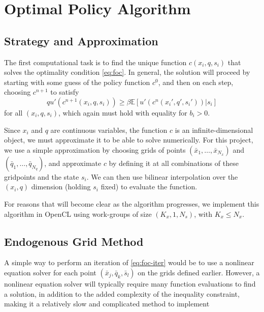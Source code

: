 \documentclass[a4paper,12pt]{article}
\newcommand{\E}{\mathbb{E}}
\numberwithin{equation}{section}
\theoremstyle{definition}
\begin{document}
\section{Optimal Policy Algorithm}
\label{sec:optim-policy-algor}

\subsection{Strategy and Approximation}

The first computational task is to find the unique function $c(x_i, q,
s_i)$ that solves the optimality condition \eqref{eq:foc}. In general,
the solution will proceed by starting with some guess of the policy
function $c^0$, and then on each step, choosing $c^{n+1}$ to satisfy
\begin{equation}
\label{eq:foc-iter}
  q u'(c^{n+1}(x_i, q, s_i)) \ge \beta \E \left[ u'(c^n(x_i', q', s_i')) \Bigr| s_i \right]
\end{equation}
for all $(x_i, q, s_i)$, which again must hold with equality for $b_i > 0$. 

Since $x_i$ and $q$ are continuous variables, the function $c$ is an
infinite-dimensional object, we must approximate it to be able to
solve numerically. For this project, we use a simple approximation by
choosing grids of points $(\bar{x}_1, \ldots, \bar{x}_{N_x})$ and
$(\bar{q}_1, \ldots, \bar{q}_{N_q})$, and approximate $c$ by defining
it at all combinations of these gridpoints and the state $s_i$. We can
then use bilinear interpolation over the $(x_i, q)$ dimension (holding
$s_i$ fixed) to evaluate the function.

For reasons that will become clear as the algorithm progresses, we
implement this algorithm in OpenCL using work-groups of size $(K_x, 1,
N_s)$, with $K_x \le N_x$.

\subsection{Endogenous Grid Method}
\label{sec:endog-grid-meth}

A simple way to perform an iteration of \eqref{eq:foc-iter} would be to
use a nonlinear equation solver for each point $(\bar{x}_j, \bar{q}_k,
\bar{s}_l)$ on the grids defined earlier. However, a nonlinear
equation solver will typically require many function evaluations to
find a solution, in addition to the added complexity of the inequality
constraint, making it a relatively slow and complicated method to
implement
\end{document}
